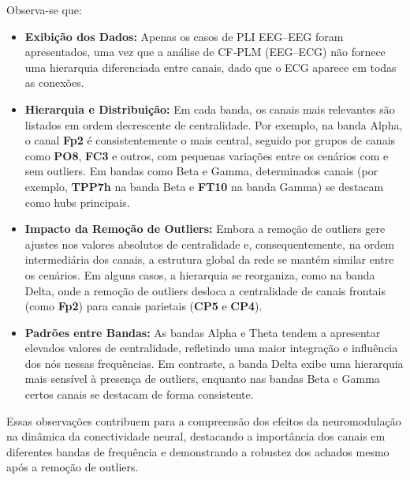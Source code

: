 Observa-se que:
\begin{itemize}
    \item \textbf{Exibição dos Dados:} Apenas os casos de PLI EEG–EEG foram apresentados, uma vez que a análise de CF‐PLM (EEG–ECG) não fornece uma hierarquia diferenciada entre canais, dado que o ECG aparece em todas as conexões.
    \item \textbf{Hierarquia e Distribuição:} Em cada banda, os canais mais relevantes são listados em ordem decrescente de centralidade. Por exemplo, na banda Alpha, o canal \textbf{Fp2} é consistentemente o mais central, seguido por grupos de canais como \textbf{PO8}, \textbf{FC3} e outros, com pequenas variações entre os cenários com e sem outliers. Em bandas como Beta e Gamma, determinados canais (por exemplo, \textbf{TPP7h} na banda Beta e \textbf{FT10} na banda Gamma) se destacam como hubs principais.
    \item \textbf{Impacto da Remoção de Outliers:} Embora a remoção de outliers gere ajustes nos valores absolutos de centralidade e, consequentemente, na ordem intermediária dos canais, a estrutura global da rede se mantém similar entre os cenários. Em alguns casos, a hierarquia se reorganiza, como na banda Delta, onde a remoção de outliers desloca a centralidade de canais frontais (como \textbf{Fp2}) para canais parietais (\textbf{CP5} e \textbf{CP4}).
    \item \textbf{Padrões entre Bandas:} As bandas Alpha e Theta tendem a apresentar elevados valores de centralidade, refletindo uma maior integração e influência dos nós nessas frequências. Em contraste, a banda Delta exibe uma hierarquia mais sensível à presença de outliers, enquanto nas bandas Beta e Gamma certos canais se destacam de forma consistente.
\end{itemize}

Essas observações contribuem para a compreensão dos efeitos da neuromodulação na dinâmica da conectividade neural, destacando a importância dos canais em diferentes bandas de frequência e demonstrando a robustez dos achados mesmo após a remoção de outliers.
